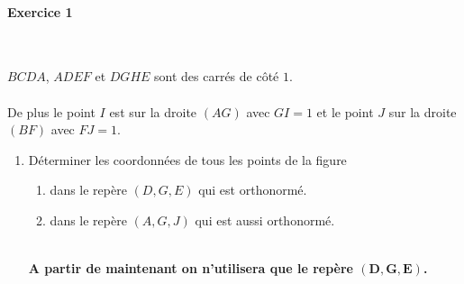 \documentclass[a4paper,11pt,twocolumn,landscape]{article}
\begin{document}
\begin{minipage}{0.45\textwidth}
\thispagestyle{firststyle}

\paragraph*{Exercice 1}~\\

\begin{minipage}{0.5\textwidth}
\begin{center}
\end{center}
\end{minipage}
\begin{minipage}{0.5\textwidth}
$BCDA$, $ADEF$ et $DGHE$ sont des carrés de côté $1$.
~\\~\\
De plus le point $I$ est sur la droite $(AG)$ avec $GI = 1$ et le point $J$ sur la droite $(BF)$ avec $FJ = 1$.

\end{minipage}

\vspace*{2em}

\begin{enumerate}
	\item Déterminer les coordonnées de tous les points de la figure
	\begin{enumerate}
		\item dans le repère $(D, G, E)$ qui est orthonormé.
		\item dans le repère $(A, G, J)$ qui est aussi orthonormé.
	\end{enumerate}
~\\
\textbf{A partir de maintenant on n’utilisera que le repère $\mathbf{\left(D, G, E\right)}$.}


\end{enumerate}
\end{minipage}
\end{document}
